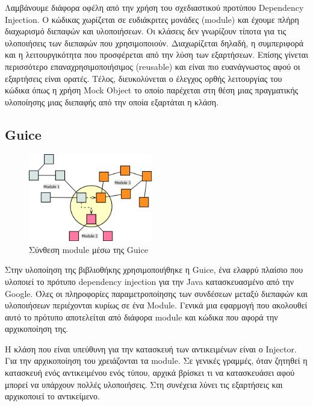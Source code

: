 Λαμβάνουμε διάφορα οφέλη από την χρήση του σχεδιαστικού προτύπου 
Dependency Injection. Ο κώδικας χωρίζεται σε ευδιάκριτες μονάδες 
(module) και έχουμε πλήρη διαχωρισμό διεπαφών και υλοποιήσεων. Οι 
κλάσεις δεν γνωρίζουν τίποτα για τις υλοποιήσεις των διεπαφών που 
χρησιμοποιούν. Διαχωρίζεται δηλαδή, η συμπεριφορά και η λειτουργικότητα 
που προσφέρεται από την λύση των εξαρτήσεων. Επίσης γίνεται περισσότερο 
επαναχρησιμοποιήσιμος (reusable) και είναι πιο ευανάγνωστος αφού οι 
εξαρτήσεις είναι ορατές. Τέλος, διευκολύνεται ο έλεγχος ορθής 
λειτουργίας του κώδικα όπως η χρήση Mock Object \citep{Freeman04mockroles} 
το οποίο παρέχεται στη θέση μιας πραγματικής υλοποίησης μιας διεπαφής από την 
οποία εξαρτάται η κλάση.

\subsection{Guice}
\begin{figure}
  \begin{center}
    \includegraphics[width=0.48\textwidth]{Figures/Guice_modules.png}
  \end{center}
  \caption{Σύνθεση module μέσω της Guice}
  \label{fig:Guice}
\end{figure}

Στην υλοποίηση της βιβλιοθήκης χρησιμοποιήθηκε η Guice, ένα ελαφρύ 
πλαίσιο που υλοποιεί το πρότυπο dependency injection για την Java 
κατασκευασμένο από την Google. Όλες οι πληροφορίες παραμετροποίησης των 
συνδέσεων μεταξύ διεπαφών και υλοποιήσεων περιέχονται κυρίως σε ένα 
Module. Γενικά μια εφαρμογή που ακολουθεί αυτό το πρότυπο αποτελείται 
από διάφορα module και κώδικα που αφορά την αρχικοποίηση της.

Η κλάση που είναι υπεύθυνη για την κατασκευή των αντικειμένων είναι ο 
Injector. Για την αρχικοποίηση του χρειάζονται τα module. Σε γενικές 
γραμμές, όταν ζητηθεί η κατασκευή ενός αντικειμένου ενός τύπου, αρχικά 
βρίσκει τι να κατασκευάσει αφού μπορεί να υπάρχουν πολλές υλοποιήσεις. 
Στη συνέχεια λύνει τις εξαρτήσεις και αρχικοποιεί το αντικείμενο.


